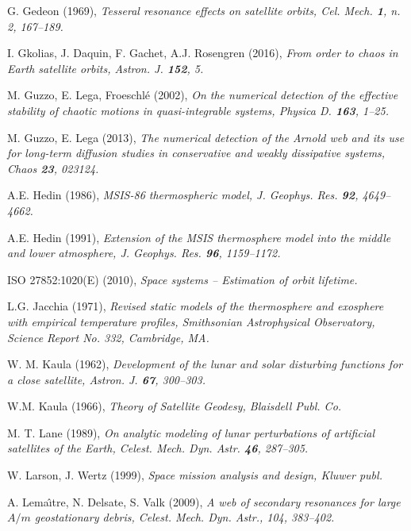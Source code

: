 \documentclass[12pt,reqno]{amsart}
\numberwithin{equation}{section}
\begin{document}
\begin{thebibliography}{}
G. Gedeon (1969), \sl Tesseral resonance effects on satellite orbits, \rm
Cel. Mech. {\bf 1}, n. 2, 167--189.

I. Gkolias, J. Daquin, F. Gachet, A.J. Rosengren (2016), \sl From order to chaos in Earth satellite orbits, \rm
Astron. J. {\bf 152}, 5.

M. Guzzo, E. Lega, Froeschl\'e (2002), \sl On the numerical detection of the effective stability of chaotic
motions in quasi-integrable systems, \rm Physica D. {\bf 163}, 1--25.

M. Guzzo, E. Lega (2013), \sl The numerical detection of the Arnold web and its use for long-term diffusion
studies in conservative and weakly dissipative systems, \rm Chaos {\bf 23}, 023124.

A.E. Hedin (1986), \sl MSIS-86 thermospheric model, \rm J. Geophys. Res. {\bf 92}, 4649--4662.

A.E. Hedin (1991), \sl Extension of the MSIS thermosphere model into the middle and lower atmosphere, \rm
J. Geophys. Res. {\bf 96}, 1159--1172.

ISO 27852:1020(E) (2010), \sl Space systems -- Estimation of orbit lifetime. \rm

L.G. Jacchia (1971), \sl Revised static models of the thermosphere and exosphere with empirical
temperature profiles, \rm Smithsonian Astrophysical Observatory, Science Report No. 332, Cambridge, MA.

W. M. Kaula (1962), \sl Development of the lunar and solar disturbing functions for a close satellite, \rm
Astron. J. {\bf 67}, 300--303.

W.M. Kaula (1966), \em Theory of Satellite Geodesy, \rm Blaisdell Publ. Co.

M. T. Lane (1989),
\sl On analytic modeling of lunar perturbations of artificial satellites of the Earth, \rm
Celest. Mech. Dyn. Astr. {\bf 46}, 287--305.

W. Larson, J. Wertz (1999), \sl Space mission analysis and design, \rm Kluwer publ.

A. Lema\^{\i}tre, N. Delsate, S. Valk (2009),
\sl A web of secondary resonances for large $A/m$ geostationary debris, \rm
Celest. Mech. Dyn. Astr., 104, 383--402.


\end{thebibliography}
\end{document}
